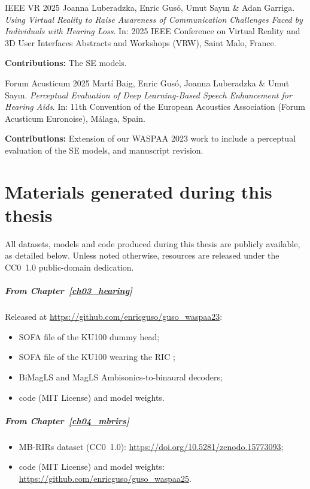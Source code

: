 \begin{mybox}{IEEE VR 2025}
    Joanna Luberadzka, Enric Gusó, Umut Say\i n \& Adan Garriga.
    \emph{Using Virtual Reality to Raise Awareness of Communication Challenges Faced by Individuals with Hearing Loss}.
    In: 2025 IEEE Conference on Virtual Reality and 3D User Interfaces Abstracts and Workshops (VRW), Saint Malo, France. 
\end{mybox}
\textbf{Contributions:} The \acrshort{SE} models.

\begin{mybox}{Forum Acusticum 2025}
    Martí Baig, Enric Gusó, Joanna Luberadzka \& Umut Say\i n.
    \emph{Perceptual Evaluation of Deep Learning-Based Speech Enhancement for Hearing Aids}.
    In: 11th Convention of the European Acoustics Association (Forum Acusticum Euronoise), Málaga, Spain.
\end{mybox}
\textbf{Contributions:} Extension of our WASPAA 2023 work to include a perceptual evaluation of the \acrshort{SE} models, and manuscript revision.

\chapter{Materials generated during this thesis}
\label{app:materials}

All datasets, models and code produced during this thesis are publicly
available, as detailed below. Unless noted otherwise, resources are released
under the CC0~1.0 public-domain dedication.

\paragraph{From Chapter~\ref{ch03_hearing}}
Released at \url{https://github.com/enricguso/guso_waspaa23}:
\begin{itemize}
    \item \acrshort{SOFA} file of the \acrshort{KU100} dummy head;
    \item \acrshort{SOFA} file of the \acrshort{KU100} wearing the
    \acrshort{RIC} ;
    \item \acrshort{BiMagLS} and \acrshort{MagLS} Ambisonics-to-binaural
    decoders;
    \item code (MIT License) and model weights.
\end{itemize}

\paragraph{From Chapter~\ref{ch04_mbrirs}}
\begin{itemize}
    \item MB-RIRs dataset (CC0~1.0):
    \url{https://doi.org/10.5281/zenodo.15773093};
    \item code  (MIT License) and model weights:
    \url{https://github.com/enricguso/guso_waspaa25}.
\end{itemize}

